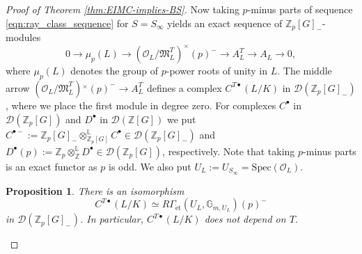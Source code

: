 \documentclass[12pt]{amsart}
\theoremstyle{plain}
\newtheorem{prop}[theorem]{Proposition}
\theoremstyle{remark}
\theoremstyle{definition}
\numberwithin{equation}{section}
\begin{document}
{\begin{proof}[Proof of Theorem \ref{thm:EIMC-implies-BS}]
Now taking $p$-minus parts of sequence \eqref{eqn:ray_class_sequence} for $S = S_{\infty}$ 
yields an exact sequence of ${\mathbb{Z}}_{p}[G]_{-}$-modules
\begin{equation} \label{eqn:minus-rayclass-sequence}
0 \longrightarrow \mu_{p}(L) \longrightarrow (\mathcal{O}_{L} / \mathfrak{M}_{L}^{T})^{\times} (p)^{-} \longrightarrow A_{L}^{T}
\longrightarrow A_{L} \longrightarrow 0,
\end{equation}
where $\mu_{p}(L)$ denotes the group of $p$-power roots of unity in $L$.
The middle arrow $(\mathcal{O}_{L} / \mathfrak{M}_{L}^{T}){^{\times}} (p)^{-} \rightarrow A_{L}^{T}$ defines a complex
$C^{T \bullet}(L/K)$ in $\mathcal{D}({\mathbb{Z}}_{p}[G]_{-})$, where we place the first module in degree zero.
For complexes $C^{\bullet}$ in $\mathcal{D}({\mathbb{Z}}_{p}[G])$ and $D^{\bullet}$ in $\mathcal{D}({\mathbb{Z}}[G])$
we put $C^{\bullet -} := {\mathbb{Z}}_{p}[G]_{-} \otimes^{\mathbb{L}}_{{\mathbb{Z}}_{p}[G]} C^{\bullet} \in \mathcal{D}({\mathbb{Z}}_{p}[G]_{-})$
and $D^{\bullet}(p) := {\mathbb{Z}}_{p}\otimes^{\mathbb{L}}_{\mathbb{Z}} D^{\bullet} \in \mathcal{D}({\mathbb{Z}}_{p}[G])$, respectively.
Note that taking $p$-minus parts is an exact functor as $p$ is odd.
We also put $U_{L} := U_{S_{\infty}} = {\mathrm{Spec}} (\mathcal{O}_{L})$.

\begin{prop}\label{prop:coh-interpretation-L/K}
There is an isomorphism
\[
C^{T \bullet}(L/K) \simeq R\Gamma_{\mathrm{\acute{e}t}}(U_{L}, \mathbb{G}_{m,U_{L}})(p)^{-}
\]
in $\mathcal{D}({\mathbb{Z}}_{p}[G]_{-})$. In particular, $C^{T \bullet}(L/K)$ does not depend on $T$.
\end{prop}


\end{proof}}
\end{document}
